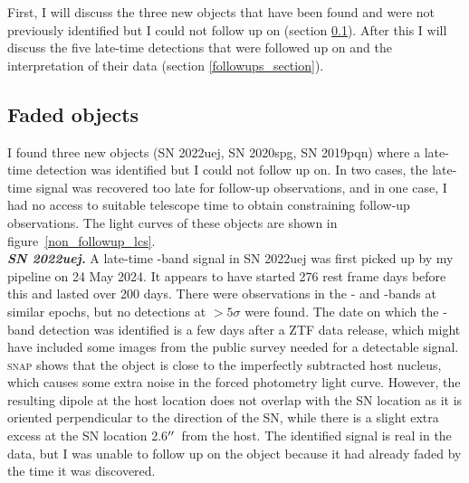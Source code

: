\documentclass[a4paper,oneside,12pt, class=Latex/Classes/PhDthesisPSnPDF, crop=false]{standalone}
\begin{document}
First, I will discuss the three new objects that have been found and were not previously identified but I could not follow up on (section \ref{sec:faded_objects}). After this I will discuss the five late-time detections that were followed up on and the interpretation of their data (section \ref{followups_section}).

\subsection{Faded objects}
\label{sec:faded_objects}
I found three new objects (SN 2022uej, SN 2020spg, SN 2019pqn) where a late-time detection was identified but I could not follow up on. In two cases, the late-time signal was recovered too late for follow-up observations, and in one case, I had no access to suitable telescope time to obtain constraining follow-up observations. The light curves of these objects are shown in figure~\ref{non_followup_lcs}.\\

\textit{\textbf{SN 2022uej.}}
A late-time \ztfr-band signal in SN 2022uej was first picked up by my pipeline on 24 May 2024. It appears to have started 276 rest frame days before this and lasted over 200 days. There were observations in the \ztfg- and \ztfi-bands at similar epochs, but no detections at $>5\sigma$ were found. The date on which the \ztfr-band detection was identified is a few days after a ZTF data release, which might have included some images from the public survey needed for a detectable signal. \textsc{snap} shows that the object is close to the imperfectly subtracted host nucleus, which causes some extra noise in the forced photometry light curve. However, the resulting dipole at the host location does not overlap with the SN location as it is oriented perpendicular to the direction of the SN, while there is a slight extra excess at the SN location 2.6$^{\prime\prime}$\ from the host. The identified signal is real in the data, but I was unable to follow up on the object because it had already faded by the time it was discovered.\\
\end{document}
